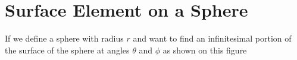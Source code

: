 

\section{Surface Element on a Sphere} \label{subsect: Surface Element on a Sphere}

If we define a sphere with radius $r$ and want to find an infinitesimal portion of the surface of the sphere at angles ${\theta}$ and ${\phi}$ as shown on this figure

